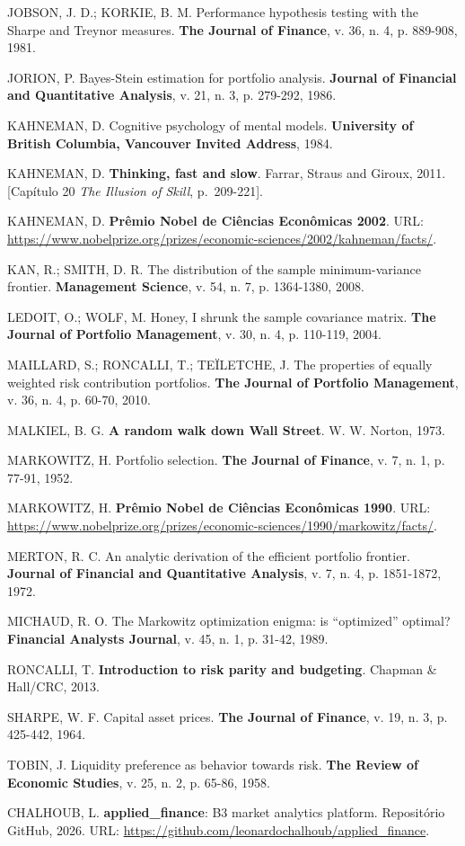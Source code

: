 \documentclass[12pt,a4paper,oneside]{article}
\begin{document}
\begin{singlespace}
\noindent JOBSON, J. D.; KORKIE, B. M. Performance hypothesis testing with
the Sharpe and Treynor measures. \textbf{The Journal of Finance},
v. 36, n. 4, p. 889-908, 1981.

\noindent JORION, P. Bayes-Stein estimation for portfolio analysis.
\textbf{Journal of Financial and Quantitative Analysis}, v. 21, n. 3,
p. 279-292, 1986.

\noindent KAHNEMAN, D. Cognitive psychology of mental models.
\textbf{University of British Columbia, Vancouver Invited Address}, 1984.

\noindent KAHNEMAN, D. \textbf{Thinking, fast and slow}. Farrar, Straus and
Giroux, 2011. [Capítulo 20 \textit{The Illusion of Skill}, p.~209-221].

\noindent KAHNEMAN, D. \textbf{Prêmio Nobel de Ciências Econômicas 2002}.
URL: \url{https://www.nobelprize.org/prizes/economic-sciences/2002/kahneman/facts/}.

\noindent KAN, R.; SMITH, D. R. The distribution of the sample minimum-variance
frontier. \textbf{Management Science}, v. 54, n. 7, p. 1364-1380, 2008.

\noindent LEDOIT, O.; WOLF, M. Honey, I shrunk the sample covariance matrix.
\textbf{The Journal of Portfolio Management}, v. 30, n. 4, p. 110-119, 2004.

\noindent MAILLARD, S.; RONCALLI, T.; TEÏLETCHE, J. The properties of equally
weighted risk contribution portfolios. \textbf{The Journal of Portfolio
Management}, v. 36, n. 4, p. 60-70, 2010.

\noindent MALKIEL, B. G. \textbf{A random walk down Wall Street}. W. W. Norton, 1973.

\noindent MARKOWITZ, H. Portfolio selection. \textbf{The Journal of Finance},
v. 7, n. 1, p. 77-91, 1952.

\noindent MARKOWITZ, H. \textbf{Prêmio Nobel de Ciências Econômicas 1990}.
URL: \url{https://www.nobelprize.org/prizes/economic-sciences/1990/markowitz/facts/}.

\noindent MERTON, R. C. An analytic derivation of the efficient portfolio frontier.
\textbf{Journal of Financial and Quantitative Analysis}, v. 7, n. 4,
p. 1851-1872, 1972.

\noindent MICHAUD, R. O. The Markowitz optimization enigma: is ``optimized''
optimal? \textbf{Financial Analysts Journal}, v. 45, n. 1, p. 31-42, 1989.

\noindent RONCALLI, T. \textbf{Introduction to risk parity and budgeting}.
Chapman \& Hall/CRC, 2013.

\noindent SHARPE, W. F. Capital asset prices. \textbf{The Journal of Finance},
v. 19, n. 3, p. 425-442, 1964.

\noindent TOBIN, J. Liquidity preference as behavior towards risk.
\textbf{The Review of Economic Studies}, v. 25, n. 2, p. 65-86, 1958.

\noindent CHALHOUB, L. \textbf{applied\_finance}: B3 market analytics platform.
Repositório GitHub, 2026.
URL: \url{https://github.com/leonardochalhoub/applied_finance}.

\end{singlespace}
\end{document}
